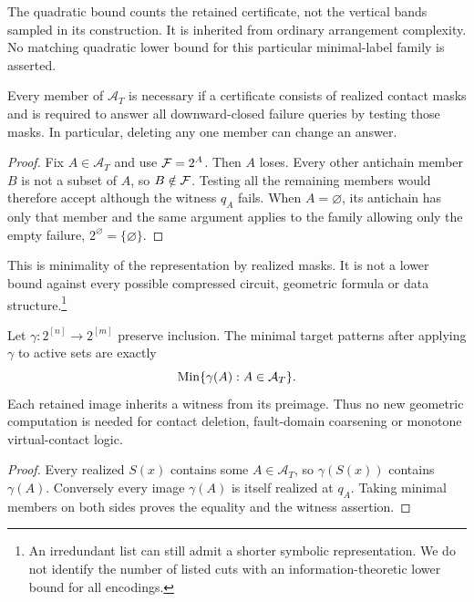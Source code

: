 \begin{remark}
The quadratic bound counts the retained certificate, not the vertical bands sampled in its construction. It is inherited from ordinary arrangement complexity. No matching quadratic lower bound for this particular minimal-label family is asserted.
\end{remark}

\begin{proposition}\label{prop:irredundant}
Every member of $\mathcal A_T$ is necessary if a certificate consists of realized contact masks and is required to answer all downward-closed failure queries by testing those masks. In particular, deleting any one member can change an answer.
\end{proposition}
\begin{proof}
Fix $A\in\mathcal A_T$ and use $\mathcal F=2^A$. Then $A$ loses. Every other antichain member $B$ is not a subset of $A$, so $B\notin\mathcal F$. Testing all the remaining members would therefore accept although the witness $q_A$ fails. When $A=\varnothing$, its antichain has only that member and the same argument applies to the family allowing only the empty failure, $2^\varnothing=\{\varnothing\}$.
\end{proof}

This is minimality of the representation by realized masks. It is not a lower bound against every possible compressed circuit, geometric formula or data structure.\footnote{An irredundant list can still admit a shorter symbolic representation. We do not identify the number of listed cuts with an information-theoretic lower bound for all encodings.}

\begin{theorem}\label{thm:relabel}
Let $\gamma:2^{[n]}\to2^{[m]}$ preserve inclusion. The minimal target patterns after applying $\gamma$ to active sets are exactly
\begin{equation}\label{eq:relabel}
\operatorname{Min}\{\gamma(A):A\in\mathcal A_T\}.
\end{equation}
Each retained image inherits a witness from its preimage. Thus no new geometric computation is needed for contact deletion, fault-domain coarsening or monotone virtual-contact logic.
\end{theorem}
\begin{proof}
Every realized $S(x)$ contains some $A\in\mathcal A_T$, so $\gamma(S(x))$ contains $\gamma(A)$. Conversely every image $\gamma(A)$ is itself realized at $q_A$. Taking minimal members on both sides proves the equality and the witness assertion.
\end{proof}

